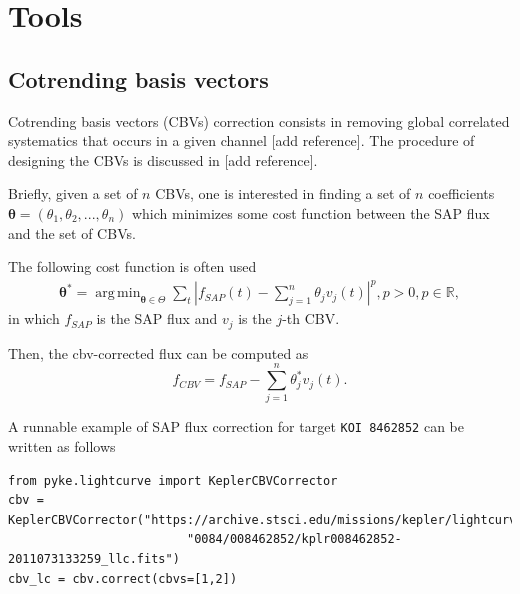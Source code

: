 \documentclass{article}
\DeclareMathOperator*{\argmin}{arg\,min}
\begin{document}
\section{Tools}

\subsection{Cotrending basis vectors}

Cotrending basis vectors (CBVs) correction consists in removing global correlated
systematics that occurs in a given channel [add reference]. The procedure of
designing the CBVs is discussed in [add reference].

Briefly, given a set of $n$ CBVs, one is interested in finding a set of $n$
coefficients $\bm{\theta}=(\theta_1, \theta_2, ..., \theta_n)$ which minimizes
some cost function between the SAP flux and the set of CBVs.

The following cost function is often used
\begin{align}
    \bm{\theta}^{*} = \argmin_{\bm{\theta} \in \Theta} \sum_{t}|f_{SAP}(t)
    - \sum_{j=1}^{n}\theta_j v_{j}(t)|^p, p>0, p \in \mathbb{R},
\end{align}
in which $f_{SAP}$ is the SAP flux and $v_j$ is the $j$-th CBV.

Then, the cbv-corrected flux can be computed as
\begin{equation}
    f_{CBV} = f_{SAP} - \sum_{j=1}^{n}\theta^{*}_j v_{j}(t).
\end{equation}

A runnable example of SAP flux correction for target \texttt{KOI 8462852}
can be written as follows
\begin{verbatim}
from pyke.lightcurve import KeplerCBVCorrector
cbv = KeplerCBVCorrector("https://archive.stsci.edu/missions/kepler/lightcurves/"
                         "0084/008462852/kplr008462852-2011073133259_llc.fits")
cbv_lc = cbv.correct(cbvs=[1,2])
\end{verbatim}
\end{document}

